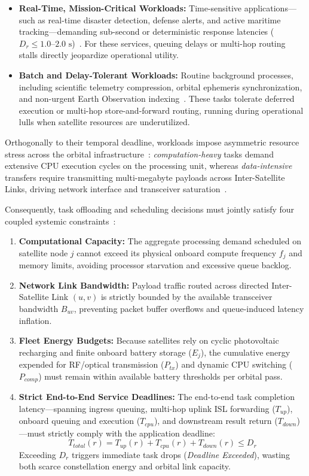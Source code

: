 \begin{itemize}
    \item \textbf{Real-Time, Mission-Critical Workloads:} Time-sensitive applications—such as real-time disaster detection, defense alerts, and active maritime tracking—demanding sub-second or deterministic response latencies ($D_r \le 1.0\text{--}2.0\text{ s}$)~\cite{leyva2023satellite}. For these services, queuing delays or multi-hop routing stalls directly jeopardize operational utility.
    \item \textbf{Batch and Delay-Tolerant Workloads:} Routine background processes, including scientific telemetry compression, orbital ephemeris synchronization, and non-urgent Earth Observation indexing~\cite{denby2019orbital}. These tasks tolerate deferred execution or multi-hop store-and-forward routing, running during operational lulls when satellite resources are underutilized.
\end{itemize}

Orthogonally to their temporal deadline, workloads impose asymmetric resource stress across the orbital infrastructure~\cite{icdcs_satellite_2025}: \emph{computation-heavy} tasks demand extensive CPU execution cycles on the processing unit, whereas \emph{data-intensive} transfers require transmitting multi-megabyte payloads across Inter-Satellite Links, driving network interface and transceiver saturation~\cite{icdcs_satellite_2025}.

Consequently, task offloading and scheduling decisions must jointly satisfy four coupled systemic constraints~\cite{zhong2025leo, icdcs_satellite_2025}:
\begin{enumerate}
    \item \textbf{Computational Capacity:} The aggregate processing demand scheduled on satellite node $j$ cannot exceed its physical onboard compute frequency $f_j$ and memory limits, avoiding processor starvation and excessive queue backlog.
    \item \textbf{Network Link Bandwidth:} Payload traffic routed across directed Inter-Satellite Link $(u, v)$ is strictly bounded by the available transceiver bandwidth $B_{uv}$, preventing packet buffer overflows and queue-induced latency inflation.
    \item \textbf{Fleet Energy Budgets:} Because satellites rely on cyclic photovoltaic recharging and finite onboard battery storage ($E_j$), the cumulative energy expended for RF/optical transmission ($P_{tx}$) and dynamic CPU switching ($P_{comp}$) must remain within available battery thresholds per orbital pass.
    \item \textbf{Strict End-to-End Service Deadlines:} The end-to-end task completion latency—spanning ingress queuing, multi-hop uplink ISL forwarding ($T_{up}$), onboard queuing and execution ($T_{cpu}$), and downstream result return ($T_{down}$)—must strictly comply with the application deadline:
    \begin{equation}
        T_{total}(r) = T_{up}(r) + T_{cpu}(r) + T_{down}(r) \le D_r
    \end{equation}
    Exceeding $D_r$ triggers immediate task drops (\textit{Deadline Exceeded}), wasting both scarce constellation energy and orbital link capacity.
\end{enumerate}
